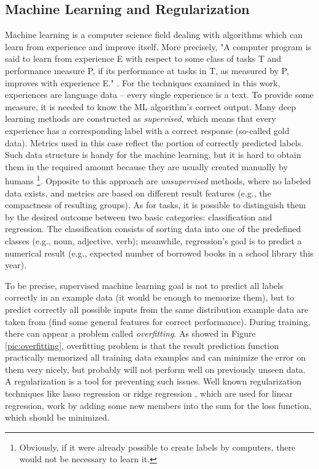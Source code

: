 \subsection{Machine Learning and Regularization}
\label{sub:ml}
Machine learning is a computer science field dealing with algorithms which can learn from experience and improve itself. More precisely, "A computer program is said to learn from experience E with respect to some class of tasks T and performance measure P, if its performance at tasks in T, as measured by P, improves with experience E." \citep{Mitchell1997}. For the techniques examined in this work, experiences are language data -- every single experience is a text. To provide some measure, it is needed to know the ML algorithm's correct output. Many deep learning methods are constructed as \textit{supervised}, which means that every experience has a corresponding label with a correct response (so-called gold data). Metrics used in this case reflect the portion of correctly predicted labels. \citep{Russell1995} Such data structure is handy for the machine learning, but it is hard to obtain them in the required amount because they are usually created manually by humans \footnote{Obviously, if it were already possible to create labels by computers, there would not be necessary to learn it.}. Opposite to this approach are \textit{unsupervised} methods, where no labeled data exists, and metrics are based on different result features (e.g., the compactness of resulting groups). As for tasks, it is possible to distinguish them by the desired outcome between two basic categories: classification and regression. The classification consists of sorting data into one of the predefined classes (e.g., noun, adjective, verb); meanwhile, regression's goal is to predict a numerical result (e.g., expected number of borrowed books in a school library this year).
\par
To be precise, supervised machine learning goal is not to predict all labels correctly in an example data (it would be enough to memorize them), but to predict correctly all possible inputs from the same distribution example data are taken from (find some general features for correct performance). During training, there can appear a problem called \textit{overfitting}. As showed in Figure \ref{pic:overfitting}, overfitting problem is that the result prediction function practically memorized all training data examples and can minimize the error on them very nicely, but probably will not perform well on previously unseen data. A regularization is a tool for preventing such issues. Well known regularization techniques like lasso regression \citep{Tibshirani1996} or ridge regression \citep{Hoerl1970}, which are used for linear regression, work by adding some new members into the sum for the loss function, which should be minimized.
